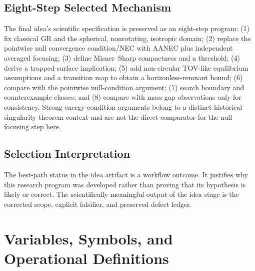 \documentclass[conference]{IEEEtran}
\begin{document}
\subsection{Eight-Step Selected Mechanism}
The final idea's scientific specification is preserved as an eight-step program: (1) fix classical GR and the spherical, nonrotating, isotropic domain; (2) replace the pointwise null convergence condition/NEC with AANEC plus independent averaged focusing; (3) define Misner--Sharp compactness and a threshold; (4) derive a trapped-surface implication; (5) add non-circular TOV-like equilibrium assumptions and a transition map to obtain a horizonless-remnant bound; (6) compare with the pointwise null-condition argument; (7) search boundary and counterexample classes; and (8) compare with mass-gap observations only for consistency. Strong-energy-condition arguments belong to a distinct historical singularity-theorem context and are not the direct comparator for the null focusing step here.

\subsection{Selection Interpretation}
The best-path status in the idea artifact is a workflow outcome. It justifies why this research program was developed rather than proving that its hypothesis is likely or correct. The scientifically meaningful output of the idea stage is the corrected scope, explicit falsifier, and preserved defect ledger.

\section{Variables, Symbols, and Operational Definitions}
\label{app:variables}
\end{document}
